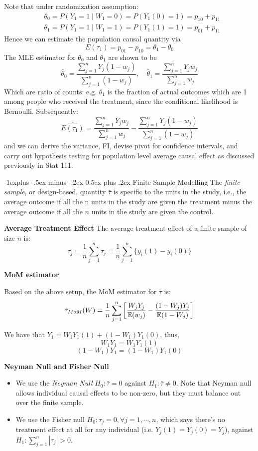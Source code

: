 \documentclass[10pt,landscape]{article}
\makeatletter
\renewcommand{\subsection}{\@startsection{subsection}{2}{0mm}%
                                {-1explus -.5ex minus -.2ex}%
                                {0.5ex plus .2ex}%
                                {\normalfont\normalsize\bfseries}}
\makeatother
\begin{document}
\begin{multicols*}{3}
Note that under randomization assumption:
$$
\begin{aligned}
& \theta_0=P\left(Y_1=1 \mid W_1=0\right)=P\left(Y_1(0)=1\right)=p_{10}+p_{11} \\
& \theta_1=P\left(Y_1=1 \mid W_1=1\right)=P\left(Y_1(1)=1\right)=p_{01}+p_{11}
\end{aligned}
$$
Hence we can estimate the population causal quantity via
$$
E\left(\tau_1\right)=p_{01}-p_{10}=\theta_1-\theta_0
$$
The MLE estimator for $\theta_0$ and $\theta_1$ are shown to be
$$
\hat{\theta}_0=\frac{\sum_{j=1}^n Y_j\left(1-w_j\right)}{\sum_{j=1}^n\left(1-w_j\right)}, \quad \hat{\theta}_1=\frac{\sum_{j=1}^n Y_j w_j}{\sum_{j=1}^n w_j}
$$
Which are ratio of counts: e.g. $\hat{\theta}_1$ is the fraction of actual outcomes which are 1 among people who received the treatment, since the conditional likelihood is Bernoulli. Subsequently:
$$
\widehat{E\left(\tau_1\right)}=\frac{\sum_{j=1}^n Y_j w_j}{\sum_{j=1}^n w_j}-\frac{\sum_{j=1}^n Y_j\left(1-w_j\right)}{\sum_{j=1}^n\left(1-w_j\right)}
$$
and we can derive the variance, FI, devise pivot for confidence intervals, and carry out hypothesis testing for population level average causal effect as discussed previously in Stat 111.

\subsection{Finite Sample Modelling}
The \textit{finite sample}, or design-based, quantity $\bar{\tau}$ is specific to the units in the study, i.e., the average outcome if all the n units in the study are given the treatment minus the average outcome if all the $n$ units in the study are given the control.


\textbf{Average Treatment Effect}
The average treatment effect of a finite sample of size $n$ is:
    $$\bar{\tau_j}=\frac{1}{n}\sum_{j=1}^n \tau_j = \frac{1}{n} \sum_{j=1}^n \{y_i(1)-y_i(0)\}$$


\textbf{MoM estimator}

Based on the above setup, the MoM estimator for $\bar{\tau}$ is:$$\hat{\tau}_{MoM} (W) = \frac{1}{n} \sum_{j=1}^n \left[\frac{W_jY_j}{\mathbb{E}(w_j)} - \frac{(1-W_j)Y_j}{\mathbb{E}(1-W_j)} \right]$$

We have that $Y_1 = W_1Y_1(1)+(1-W_1)Y_1(0)$, thus, $$W_1Y_1 = W_1Y_1(1)$$ $$(1-W_1)Y_1 = (1-W_1)Y_1(0)$$

\textbf{Neyman Null and Fisher Null}
\begin{itemize}
    \item  We use the \textit{Neyman Null} $H_0 : \bar{\tau} = 0$ against $H_1 :  \bar{\tau}  \neq 0$. Note that Neyman null allows individual causal effects to be non-zero, but they must balance out over the finite sample.
    \item We use the Fisher null $H_0 : \tau_j = 0, \forall j = 1, \cdots , n$, which says there’s no treatment effect at all for any individual (i.e. $Y_j(1) = Y_j(0) = Y_j$), against $H_1 : \sum_{j=1}^n |\tau_j| > 0$.
\end{itemize}


\end{multicols*}
\end{document}
